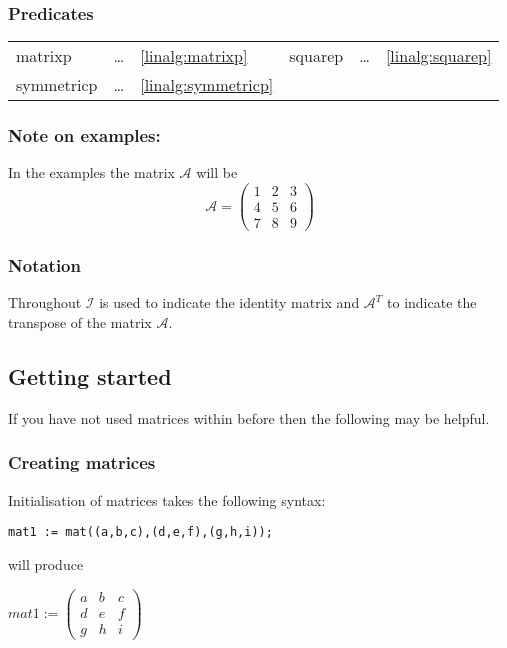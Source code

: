 \subsubsection{Predicates}

\begin{center}
  \begin{tabular}{l l l l l l}
    matrixp     & \ldots &\ref{linalg:matrixp} &
    squarep     & \ldots &\ref{linalg:squarep} \\
    symmetricp  & \ldots &\ref{linalg:symmetricp} &
  \end{tabular}
\end{center}


\subsubsection*{Note on examples:}

In the examples the matrix $\mathcal{A}$ will be
\[
\mathcal{A} = \begin{pmatrix} 1 & 2 & 3 \\ 4 & 5 & 6 \\ 7 & 8 & 9 \end{pmatrix}
\]


\subsubsection*{Notation}

Throughout $\mathcal{I}$ is used to indicate the identity matrix and
$\mathcal{A}^T$ to indicate the transpose of the matrix $\mathcal{A}$.

\subsection{Getting started}

If you have not used matrices within {\REDUCE} before then the following may be
helpful.

\subsubsection*{Creating matrices}

Initialisation of matrices takes the following syntax:

{\tt mat1 := mat((a,b,c),(d,e,f),(g,h,i));}

will produce

\begin{flushleft}
\(
mat1 := \begin{pmatrix} a & b & c \\ d & e & f \\ g & h & i \end{pmatrix}
\)
\end{flushleft}

